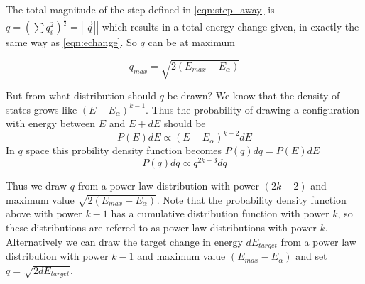 \documentclass[a4paper]{article}
\begin{document}
The total magnitude of the step defined in \ref{eqn:step_away} is $q =
\left( \sum{q_i^2} \right)^{\frac{1}{2}} = \left|\left|\vec{q}\right|\right|$ which results in a total energy change given, in
exactly the same way as \ref{eqn:echange}.  So $q$ can be at maximum

\begin{equation}
  q_{max} = \sqrt{2 (E_{max} - E_{\alpha})}
\end{equation}


But from what distribution should $q$ be drawn?  
We know that the density of states grows like $(E-E_{\alpha})^{k-1}$.
Thus the probability of drawing a configuration with energy
between $E$ and $E+dE$ should be 
\begin{equation}
  P(E)dE \propto (E-E_{\alpha})^{k-2}dE
\end{equation}
In $q$ space this probility density function becomes $P(q)dq = P(E)dE$
\begin{equation}
  P(q)dq \propto q^{2k-3}dq
\end{equation}

Thus we draw $q$ from a power law distribution with power $(2k-2)$ and maximum
value $\sqrt{2 (E_{max} - E_{\alpha})}$.  Note that the probability density
function above with power $k-1$ has a cumulative distribution function with
power $k$, so these distributions are refered to as power law distributions
with power $k$.
Alternatively we can draw the target change in energy $dE_{target}$ from a power law
distribution with power $k-1$ and maximum value $(E_{max} - E_{\alpha})$
and set $q = \sqrt{2 dE_{target}}$.





\end{document}
